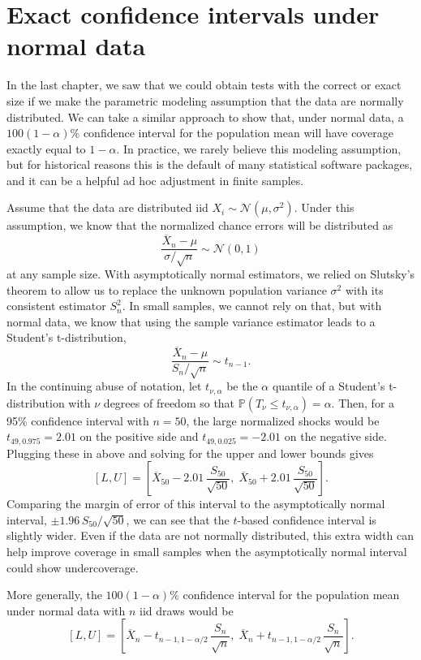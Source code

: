 \documentclass[
  13pt,
  letterpaper,
  DIV=11,
  numbers=noendperiod]{scrreprt}
\newcommand{\N}{\mathcal{N}}
\renewcommand{\P}{\mathbb{P}}
\newcommand{\Xbar}{\overline{X}}
\theoremstyle{plain}
\theoremstyle{plain}
\theoremstyle{definition}
\theoremstyle{definition}
\theoremstyle{remark}
\begin{document}
\section{Exact confidence intervals under normal
data}\label{exact-confidence-intervals-under-normal-data}

In the last chapter, we saw that we could obtain tests with the correct
or exact size if we make the parametric modeling assumption that the
data are normally distributed. We can take a similar approach to show
that, under normal data, a \(100(1-\alpha)\%\) confidence interval for
the population mean will have coverage exactly equal to \(1-\alpha\). In
practice, we rarely believe this modeling assumption, but for historical
reasons this is the default of many statistical software packages, and
it can be a helpful ad hoc adjustment in finite samples.

Assume that the data are distributed iid \(X_i \sim \N(\mu, \sigma^2)\).
Under this assumption, we know that the normalized chance errors will be
distributed as \[
\frac{\Xbar_n - \mu}{\sigma / \sqrt{n}} \sim \N(0, 1)
\] at any sample size. With asymptotically normal estimators, we relied
on Slutsky's theorem to allow us to replace the unknown population
variance \(\sigma^2\) with its consistent estimator \(S^2_n\). In small
samples, we cannot rely on that, but with normal data, we know that
using the sample variance estimator leads to a Student's t-distribution,
\[
\frac{\Xbar_n - \mu}{S_n / \sqrt{n}} \sim t_{n-1}.
\] In the continuing abuse of notation, let \(t_{\nu,\alpha}\) be the
\(\alpha\) quantile of a Student's t-distribution with \(\nu\) degrees
of freedom so that \(\P(T_{\nu} \leq t_{\nu, \alpha}) = \alpha\). Then,
for a 95\% confidence interval with \(n=50\), the large normalized
shocks would be \(t_{49, 0.975} = 2.01\) on the positive side and
\(t_{49, 0.025} = -2.01\) on the negative side. Plugging these in above
and solving for the upper and lower bounds gives \[
[L, U] = \left[\Xbar_{50} - 2.01 \, \frac{S_{50}}{\sqrt{50}}, \; \Xbar_{50} + 2.01 \, \frac{S_{50}}{\sqrt{50}} \right].
\] Comparing the margin of error of this interval to the asymptotically
normal interval, \(\pm 1.96\,S_{50}/\sqrt{50}\), we can see that the
\(t\)-based confidence interval is slightly wider. Even if the data are
not normally distributed, this extra width can help improve coverage in
small samples when the asymptotically normal interval could show
undercoverage.

More generally, the \(100(1-\alpha)\%\) confidence interval for the
population mean under normal data with \(n\) iid draws would be \[
[L, U] = \left[\Xbar_{n} - t_{n-1,1-\alpha/2} \, \frac{S_{n}}{\sqrt{n}},\; \Xbar_{n} + t_{n-1,1-\alpha/2} \, \frac{S_{n}}{\sqrt{n}} \right].
\]
\end{document}
